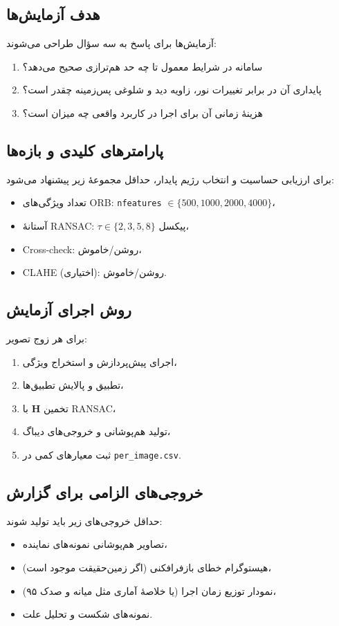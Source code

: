 
\subsection{هدف آزمایش‌ها}
آزمایش‌ها برای پاسخ به سه سؤال طراحی می‌شوند:
\begin{enumerate}
  \item سامانه در شرایط معمول تا چه حد هم‌ترازی صحیح می‌دهد؟
  \item پایداری آن در برابر تغییرات نور، زاویه دید و شلوغی پس‌زمینه چقدر است؟
  \item هزینهٔ زمانی آن برای اجرا در کاربرد واقعی چه میزان است؟
\end{enumerate}

\subsection{پارامترهای کلیدی و بازه‌ها}
برای ارزیابی حساسیت و انتخاب رژیم پایدار، حداقل مجموعهٔ زیر پیشنهاد می‌شود:
\begin{itemize}
  \item تعداد ویژگی‌های ORB: \texttt{nfeatures} $\in \{500, 1000, 2000, 4000\}$،
  \item آستانهٔ RANSAC: $\tau \in \{2,3,5,8\}$ پیکسل،
  \item Cross-check: روشن/خاموش،
  \item CLAHE (اختیاری): روشن/خاموش.
\end{itemize}

\subsection{روش اجرای آزمایش}
برای هر زوج تصویر:
\begin{enumerate}
  \item اجرای پیش‌پردازش و استخراج ویژگی،
  \item تطبیق و پالایش تطبیق‌ها،
  \item تخمین $\mathbf{H}$ با RANSAC،
  \item تولید هم‌پوشانی و خروجی‌های دیباگ،
  \item ثبت معیارهای کمی در \texttt{per\_image.csv}.
\end{enumerate}

\subsection{خروجی‌های الزامی برای گزارش}
حداقل خروجی‌های زیر باید تولید شوند:
\begin{itemize}
  \item تصاویر هم‌پوشانی نمونه‌های نماینده،
  \item هیستوگرام خطای بازفرافکنی (اگر زمین‌حقیقت موجود است)،
  \item نمودار توزیع زمان اجرا (یا خلاصهٔ آماری مثل میانه و صدک ۹۵)،
  \item نمونه‌های شکست و تحلیل علت.
\end{itemize}

